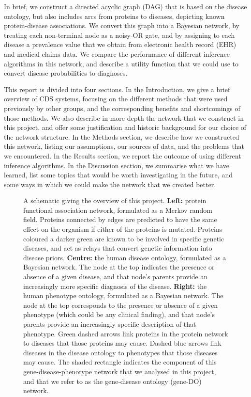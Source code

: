 \documentclass[11pt]{article}
\begin{document}
In brief, we construct a directed acyclic graph (DAG) that is based on the disease ontology, but also includes arcs from proteins to diseases, depicting known protein-disease associations. We convert this graph into a Bayesian network, by treating each non-terminal node as a noisy-OR gate, and by assigning to each disease a prevalence value that we obtain from electronic health record (EHR) and medical claims data. We compare the performance of different inference algorithms in this network, and describe a utility function that we could use to convert disease probabilities to diagnoses. 

This report is divided into four sections. In the Introduction, we give a brief overview of CDS systems, focusing on the different methods that were used previously by other groups, and the corresponding benefits and shortcomings of those methods. We also describe in more depth the network that we construct in this project, and offer some justification and historic background for our choice of the network structure. In the Methods section, we describe how we constructed this network, listing our assumptions, our sources of data, and the problems that we encountered. In the Results section, we report the outcome of using different inference algorithms. In the Discussion section, we summarise what we have learned, list some topics that would be worth investigating in the future, and some ways in which we could make the network that we created better. 


\begin{figure} %
\centering
\caption{
A schematic giving the overview of this project. \textbf{Left:} protein functional association network, formulated as a Merkov random field. Proteins connected by edges are predicted to have the same effect on the organism if either of the proteins is mutated. Proteins coloured a darker green are known to be involved in specific genetic diseases, and act as relays that convert genetic information into disease priors. \textbf{Centre:} the human disease ontology, formulated as a Bayesian network. The node at the top indicates the presence or absence of a given disease, and that node's parents provide an increasingly more specific diagnosis of the disease. \textbf{Right:} the human phenotype ontology, formulated as a Bayesian network. The node at the top corresponds to the presence or absence of a given phenotype (which could be any clinical finding), and that node's parents provide an increasingly specific description of that phenotype. Green dashed arrows link proteins in the protein network to diseases that those proteins may cause. Dashed blue arrows link diseases in the disease ontology to phenotypes that those diseases may cause. The shaded rectangle indicates the component of this gene-disease-phenotype network that we analysed in this project, and that we refer to as the gene-disease ontology (gene-DO) network.
}
\label{fig:gene-disease-phenotype}
\end{figure}
\end{document}
